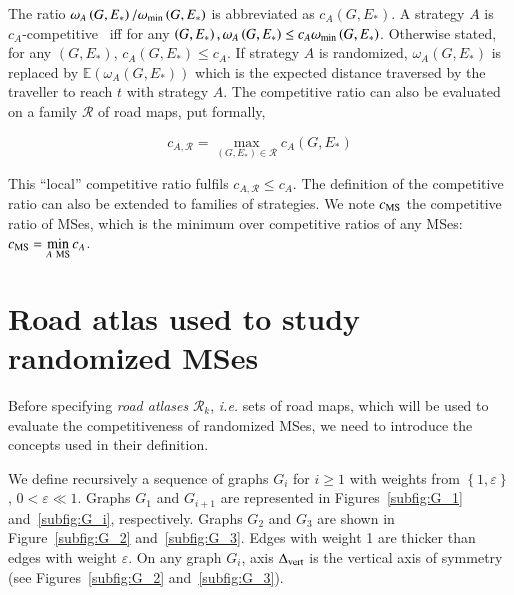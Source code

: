 \documentclass[preprint]{elsarticle}
\newcommand{\set}[1]{\left\{ #1 \right\}}
\newcommand{\omegamin}{\omega_{\mbox{\scriptsize{min}}}}
\newcommand{\mcalr}{\mathcal{R}}
\newcommand{\mts}{MS}
\newcommand{\deltavert}{\Delta_{\mbox{\scriptsize{vert}}}}
\newcommand{\cms}{c_{\mbox{\scriptsize{MS}}}}
\begin{document}
The ratio $\omega_A\left(G,E_*\right)/\omegamin\left(G,E_*\right)$ is abbreviated as $c_A\left(G,E_*\right)$. A strategy $A$ is $c_A$-competitive~\cite{BoEl98,XuHuSuZh09} iff for any $\left(G,E_*\right), \omega_A\left(G,E_*\right) \leq c_A \omegamin\left(G,E_*\right)$. Otherwise stated, for any $\left(G,E_*\right)$, $c_A\left(G,E_*\right) \leq c_A$. If strategy $A$ is randomized, $\omega_A\left(G,E_*\right)$ is replaced by $\mathbb{E}\left(\omega_A\left(G,E_*\right)\right)$ which is the expected distance traversed by the traveller to reach $t$ with strategy $A$. The competitive ratio can also be evaluated on a family $\mathcal{R}$ of road maps, put formally,

\begin{equation}
c_{A,\mathcal{R}} = \max\limits_{\left(G,E_*\right) \in \mathcal{R}} c_A\left(G,E_*\right)
\end{equation}

This ``local'' competitive ratio fulfils $c_{A,\mathcal{R}} \le c_A$. The definition of the competitive ratio can also be extended to families of strategies. We note $\cms$ the competitive ratio of \mts es, which is the minimum over competitive ratios of any \mts es: $\cms = \min\limits_{A ~\mbox{\scriptsize{\mts}}} c_A$. 
\section{Road atlas used to study randomized \mts es} \label{sec:roadatlas}

Before specifying \textit{road atlases} $\mcalr_k$, {\em i.e.} sets of road maps, which will be used to evaluate the competitiveness of randomized \mts es, we need to introduce the concepts used in their definition.


We define recursively a sequence of graphs $G_i$ for $i \geq 1$ with weights from $\set{1,\varepsilon}$, $0 < \varepsilon \ll 1$. Graphs $G_1$ and $G_{i+1}$ are represented in Figures~\ref{subfig:G_1} and~\ref{subfig:G_i}, respectively. Graphs $G_2$ and $G_3$ are shown in Figure~\ref{subfig:G_2} and~\ref{subfig:G_3}. Edges with weight 1 are thicker than edges with weight $\varepsilon$. On any graph $G_i$, axis $\deltavert$ is the vertical axis of symmetry (see Figures~\ref{subfig:G_2} and~\ref{subfig:G_3}).
\end{document}
